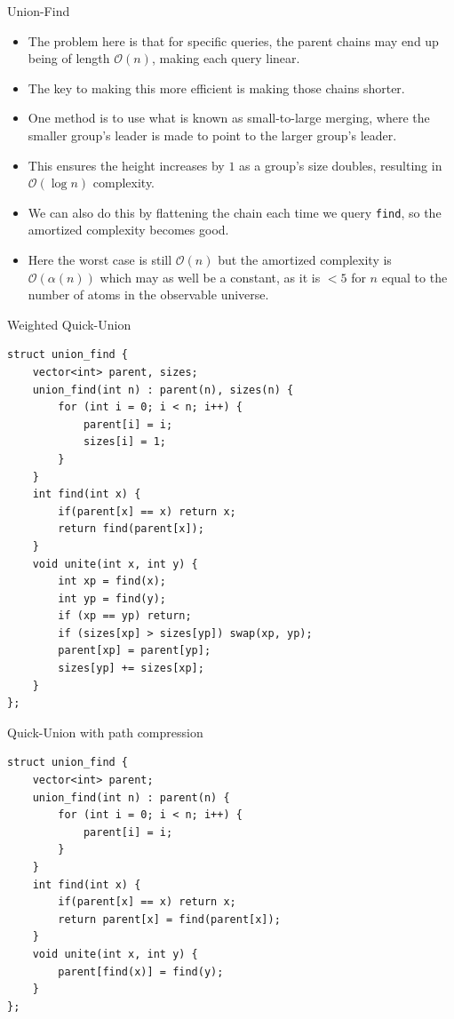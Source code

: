 \documentclass{beamer}
\begin{document}
\begin{frame}[plain]{Union-Find}
    \begin{itemize}
        \item<1-> The problem here is that for specific queries, the parent chains may end up being of length $\mathcal{O}(n)$, making each query linear.
        \item<1-> The key to making this more efficient is making those chains shorter.
        \item<2-> One method is to use what is known as small-to-large merging, where the smaller group's leader is made to point to the larger group's leader.
        \item<2-> This ensures the height increases by $1$ as a group's size doubles, resulting in $\mathcal{O}(\log n)$ complexity.
        \item<3-> We can also do this by flattening the chain each time we query \texttt{find}, so the amortized complexity becomes good.
        \item<3-> Here the worst case is still $\mathcal{O}(n)$ but the amortized complexity is $\mathcal{O}(\alpha(n))$ which may as well be a constant, as it is $<5$ for $n$ equal to the number of atoms in the observable universe.
    \end{itemize}
\end{frame}

\begin{frame}{Weighted Quick-Union}
    \begin{scriptsize}
    \begin{verbatim}
struct union_find {
    vector<int> parent, sizes;
    union_find(int n) : parent(n), sizes(n) {
        for (int i = 0; i < n; i++) {
            parent[i] = i;
            sizes[i] = 1;
        }
    }
    int find(int x) {
        if(parent[x] == x) return x;
        return find(parent[x]);
    }
    void unite(int x, int y) {
        int xp = find(x);
        int yp = find(y);
        if (xp == yp) return;
        if (sizes[xp] > sizes[yp]) swap(xp, yp);
        parent[xp] = parent[yp];
        sizes[yp] += sizes[xp];
    }
};
    \end{verbatim}
    \end{scriptsize}
\end{frame}

\begin{frame}{Quick-Union with path compression}
    \begin{small}
    \begin{verbatim}
struct union_find {
    vector<int> parent;
    union_find(int n) : parent(n) {
        for (int i = 0; i < n; i++) {
            parent[i] = i;
        }
    }
    int find(int x) {
        if(parent[x] == x) return x;
        return parent[x] = find(parent[x]);
    }
    void unite(int x, int y) {
        parent[find(x)] = find(y);
    }
};
    \end{verbatim}
    \end{small}
\end{frame}
\end{document}
